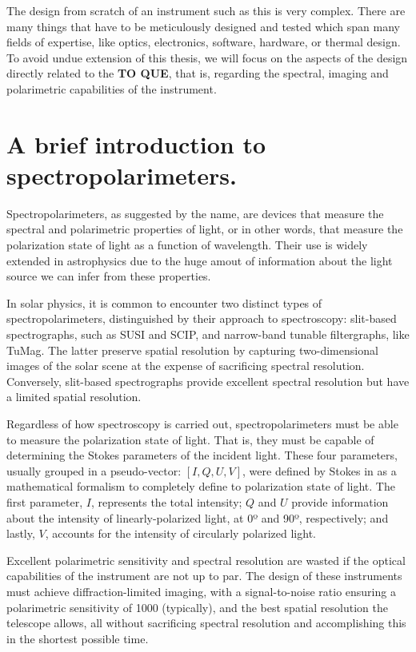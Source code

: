 The design from scratch of an instrument such as this is very complex. There are many things that have to be meticulously designed and tested which span many fields of expertise, like optics, electronics, software, hardware, or thermal design. To avoid undue extension of this thesis, we will focus on the aspects of the design directly related to the \textbf{TO QUE}, that is, regarding the spectral, imaging and polarimetric capabilities of the instrument. 

\section{A brief introduction to spectropolarimeters.}

Spectropolarimeters, as suggested by the name, are devices that measure the spectral and polarimetric properties of light, or in other words, that measure the polarization state of light as a function of wavelength. Their use is widely extended in astrophysics due to the huge amout of information about the light source we can infer from these properties.

In solar physics, it is common to encounter two distinct types of spectropolarimeters, distinguished by their approach to spectroscopy: slit-based spectrographs, such as SUSI and SCIP, and narrow-band tunable filtergraphs, like TuMag. The latter preserve spatial resolution by capturing two-dimensional images of the solar scene at the expense of sacrificing spectral resolution. Conversely, slit-based spectrographs provide excellent spectral resolution but have a limited spatial resolution. 

Regardless of how spectroscopy is carried out, spectropolarimeters must be able to measure the polarization state of light. That is, they must be capable of determining the Stokes parameters  of the incident light. These four parameters, usually grouped in a pseudo-vector: $[I, Q, U, V]$, were defined by Stokes in \cite{Stokes_vector} as a mathematical formalism to completely define to polarization state of light. The first parameter, $I$, represents the total intensity; $Q$ and $U$ provide information about the intensity of linearly-polarized light, at 0º and 90º, respectively; and lastly, $V$, accounts for the intensity of circularly polarized light. 

Excellent polarimetric sensitivity and spectral resolution are wasted if the optical capabilities of the instrument are not up to par. The design of these instruments must achieve diffraction-limited imaging, with a signal-to-noise ratio ensuring a polarimetric sensitivity of 1000 (typically), and the best spatial resolution the telescope allows, all without sacrificing spectral resolution and accomplishing this in the shortest possible time.

